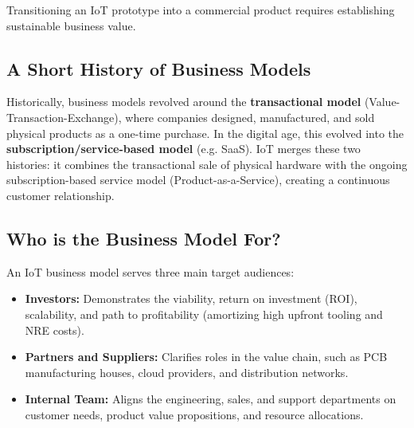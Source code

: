 \documentclass[12pt,a4paper]{article}
\begin{document}
Transitioning an IoT prototype into a commercial product requires establishing sustainable business value.

\subsection{A Short History of Business Models}
Historically, business models revolved around the \textbf{transactional model} (Value-Transaction-Exchange), where companies designed, manufactured, and sold physical products as a one-time purchase. 
In the digital age, this evolved into the \textbf{subscription/service-based model} (e.g. SaaS). IoT merges these two histories: it combines the transactional sale of physical hardware with the ongoing subscription-based service model (Product-as-a-Service), creating a continuous customer relationship.

\subsection{Who is the Business Model For?}
An IoT business model serves three main target audiences:
\begin{itemize}[leftmargin=*, itemsep=3.0pt]
  \item \textbf{Investors:} Demonstrates the viability, return on investment (ROI), scalability, and path to profitability (amortizing high upfront tooling and NRE costs).
  \item \textbf{Partners and Suppliers:} Clarifies roles in the value chain, such as PCB manufacturing houses, cloud providers, and distribution networks.
  \item \textbf{Internal Team:} Aligns the engineering, sales, and support departments on customer needs, product value propositions, and resource allocations.
\end{itemize}
\end{document}
